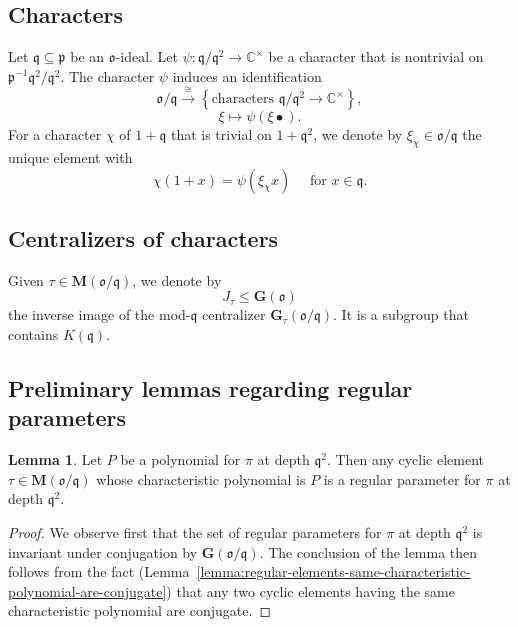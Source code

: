 \documentclass[reqno]{amsart}
\theoremstyle{plain} \newtheorem{theorem} {Theorem} \newtheorem{conjecture} {Conjecture} \newtheorem{corollary} [theorem] {Corollary} \newtheorem{proposition} [theorem] {Proposition} \newtheorem{fact} [theorem] {Fact}
\theoremstyle{definition} \newtheorem{definition} [theorem] {Definition}
\theoremstyle{itplain} %
\newtheorem{lemma}[theorem]{Lemma}
\newcommand{\mfq}{\mathfrak{q}}
\begin{document}
\subsection{Characters}\label{sec:characters-in-construction-test-vectors}
Let $\mfq \subseteq \mathfrak{p}$ be an $\mathfrak{o}$-ideal.  Let $\psi : \mfq / \mfq^2 \rightarrow \mathbb{C}^\times$ be a character that is nontrivial on $\mathfrak{p} ^{-1} \mfq^2 / \mfq^2$.  The character $\psi$ induces an identification
\begin{equation*}
  \mathfrak{o} / \mfq \xrightarrow{\cong } \left\{ \text{characters } \mfq / \mfq^2 \rightarrow \mathbb{C} ^\times  \right\},
\end{equation*}
\begin{equation*}
  \xi \mapsto \psi(\xi \bullet).
\end{equation*}
For a character $\chi$ of $1 + \mfq$ that is trivial on $1 + \mfq^2$, we denote by $\xi_\chi \in \mathfrak{o}/\mfq$ the unique element with
\begin{equation*}
  \chi(1 + x) = \psi(\xi_\chi x) \quad \text{ for } x \in \mfq.
\end{equation*}



\subsection{Centralizers of characters}\label{sec:centralizers-characters-J-tau}
Given $\tau \in \mathbf{M}(\mathfrak{o}/\mfq)$, we denote by
\begin{equation*}
  J_\tau \leq \mathbf{G}(\mathfrak{o})
\end{equation*}
the inverse image of the mod-$\mfq$ centralizer $\mathbf{G}_\tau(\mathfrak{o}/\mfq)$.  It is a subgroup that contains $K(\mfq)$.

\subsection{Preliminary lemmas regarding regular parameters}\label{sec:regular-uniform-representations}

\begin{lemma}\label{lemma:let-p-be-polyn-pi-at-depth-mathfr-let-tau-in-mathb}
  Let $P$ be a polynomial for $\pi$ at depth $\mfq^2$.  Then any cyclic element $\tau \in \mathbf{M}(\mathfrak{o}/\mfq)$ whose characteristic polynomial is $P$ is a regular parameter for $\pi$ at depth $\mfq^2$.
\end{lemma}
\begin{proof}
  We observe first that the set of regular parameters for $\pi$ at depth $\mfq^2$ is invariant under conjugation by $\mathbf{G}(\mathfrak{o}/\mfq)$.  The conclusion of the lemma then follows from the fact (Lemma~\ref{lemma:regular-elements-same-characteristic-polynomial-are-conjugate}) that any two cyclic elements having the same characteristic polynomial are conjugate.
\end{proof}
\end{document}
